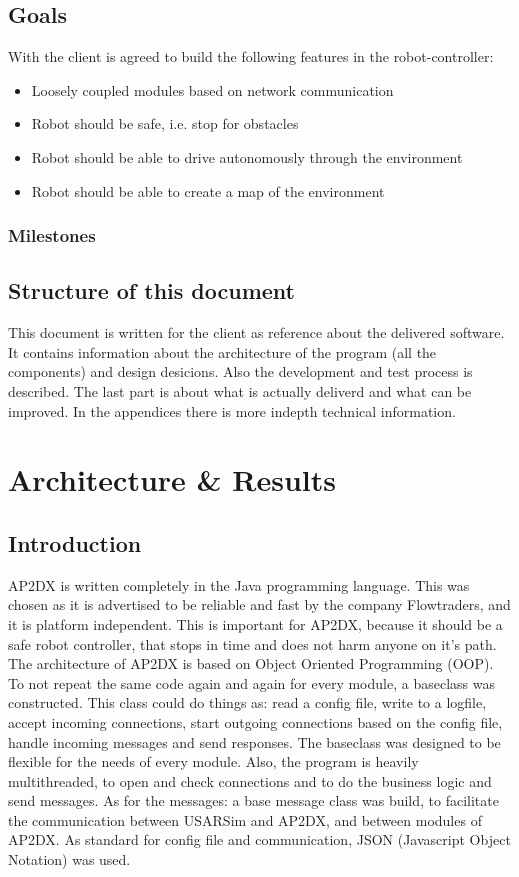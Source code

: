 \documentclass[titlepage, a4paper,10pt]{article}
\begin{document}
\subsection{Goals}
With the client is agreed to build the following features in the robot-controller:
\begin{itemize}
\item Loosely coupled modules based on network communication
\item Robot should be safe, i.e. stop for obstacles
\item Robot should be able to drive autonomously through the environment
\item Robot should be able to create a map of the environment
\end{itemize}

\subsubsection{Milestones}

\subsection{Structure of this document}
This document is written for the client as reference about the delivered software. It contains information about the architecture of the program (all the components) and design desicions. Also the development and test process is described. The last part is about what is actually deliverd and what can be improved. In the appendices there is more indepth technical information.

\newpage

\section{Architecture \& Results}
\subsection{Introduction}
AP2DX is written completely in the Java programming language. 
This was chosen as it is advertised to be reliable and fast by the company Flowtraders, and it is platform independent. This is important for AP2DX, because it should be a safe robot controller, that stops in time and does not harm anyone on it's path. The architecture of AP2DX is based on Object Oriented Programming (OOP).
To not repeat the same code again and again for every module, a baseclass was constructed. 
This class could do things as: read a config file, write to a logfile, accept incoming connections, start outgoing connections based on the config file, handle incoming messages and send responses.
The baseclass was designed to be flexible for the needs of every module. Also, the program is heavily multithreaded, to open and check connections and to do the business logic and send messages. As for the messages: a base message class was build, to facilitate the communication between USARSim and AP2DX, and between modules of AP2DX. As standard for config file and communication, JSON (Javascript Object Notation) was used. 
\end{document}
